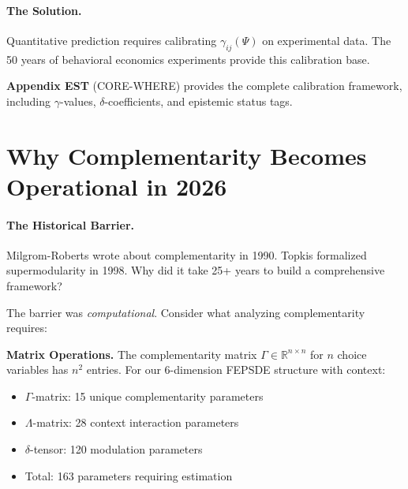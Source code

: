 \paragraph{The Solution.}
Quantitative prediction requires calibrating $\gamma_{ij}(\Psi)$ on experimental data.
The 50 years of behavioral economics experiments provide this calibration base.

\begin{cross-reference}
\textbf{Appendix EST} (CORE-WHERE) provides the complete calibration framework,
including $\gamma$-values, $\delta$-coefficients, and epistemic status tags.
\end{cross-reference}



\section{Why Complementarity Becomes Operational in 2026}
\label{sec:comp-computational}


\paragraph{The Historical Barrier.}
Milgrom-Roberts wrote about complementarity in 1990.
Topkis formalized supermodularity in 1998.
Why did it take 25+ years to build a comprehensive framework?

The barrier was \emph{computational}. Consider what analyzing complementarity requires:

\textbf{Matrix Operations.}
The complementarity matrix $\Gamma \in \mathbb{R}^{n \times n}$ for $n$ choice variables
has $n^2$ entries. For our 6-dimension FEPSDE structure with context:
\begin{itemize}[nosep]
  \item $\Gamma$-matrix: 15 unique complementarity parameters
  \item $\Lambda$-matrix: 28 context interaction parameters
  \item $\delta$-tensor: 120 modulation parameters
  \item Total: 163 parameters requiring estimation
\end{itemize}


